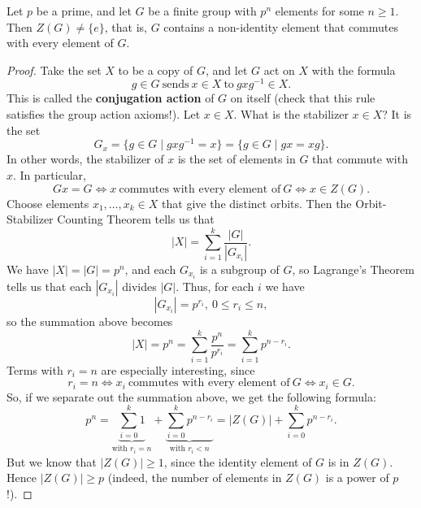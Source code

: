 \documentclass[math1530-lecture-notes]{subfiles}
\begin{document}
\begin{theorem}{}
  Let $p$ be a prime, and let $G$ be a finite group with $p^n$ elements for some $n\ge 1$. Then
  $Z(G)\neq \{ e \}$, that is, $G$ contains a non-identity element that commutes with every element
  of $G$.
\end{theorem}
\begin{proof}[Proof]
  Take the set $X$ to be a copy of $G$, and let $G$ act on $X$ with the formula \[
    g\in G ~\text{sends}~x\in X~\text{to}~gxg^{-1}\in X
  .\] This is called the \textbf{conjugation action} of $G$ on itself (check that this rule
  satisfies the group action axioms!). Let $x\in X$. What is the stabilizer $x\in X$? It is the set
  \[
    G_x=\{g\in G\mid gxg^{-1}=x\} =\{g\in G\mid gx=xg \} 
  .\] In other words, the stabilizer of $x$ is the set of elements in $G$ that commute with $x$. In
  particular, \[
    Gx=G \iff x~\text{commutes with every element of}~G\iff x\in Z(G)
  .\] Choose elements $x_1,\ldots,x_k\in X$ that give the distinct orbits. Then the Orbit-Stabilizer
  Counting Theorem tells us that \[
    \left| X \right| =\sum_{i=1}^{k} \frac{\left| G \right| }{\left| G_{x_i} \right| }
  .\] We have $\left| X \right| =\left| G \right| =p^n$, and each $G_{x_i}$ is a subgroup of $G$, so
  Lagrange's Theorem tells us that each $\left| G_{x_i} \right| $ divides $\left| G \right|
  $. Thus, for each $i$ we have \[
    \left| G_{x_i} \right| =p^{r_i},\ 0\le r_i\le n
  ,\] so the summation above becomes \[
    \left| X \right|=p^n =\sum_{i=1}^{k} \frac{p^n}{p^{r_i}}=\sum_{i=1}^{k} p^{n-r_i}
  .\] Terms with $r_i=n$ are especially interesting, since \[
    r_i=n\iff x_i~\text{commutes with every element of}~G\iff x_i\in G
  .\] So, if we separate out the summation above, we get the following formula: \[
    p^n=\underbrace{\sum_{i=0}^{k} 1}_\text{with $r_i=n$}+\underbrace{\sum_{i=0}^{k}
    p^{n-r_i}}_\text{with $r_i<n$}=\left| Z(G) \right| +\sum_{i=0}^{k} p^{n-r_i}
  .\] But we know that $\left| Z(G) \right| \ge 1$, since the identity element of $G$ is in $Z(G)$.
  Hence $\left| Z(G) \right| \ge p$ (indeed, the number of elements in $Z(G)$ is a power of
  $p$!).
\end{proof}
\end{document}
